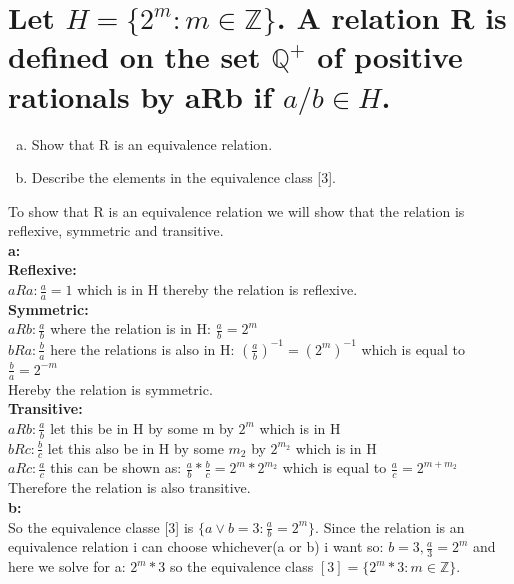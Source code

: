 \newpage
\section{Let $H = \{2^m : m\in \mathbb{Z}\}$. A relation R is defined on the set $\mathbb{Q}^{+}$ of positive rationals by aRb if $a/b\in H$.}
\begin{enumerate}[a.]
\item Show that R is an equivalence relation.
\item Describe the elements in the equivalence class [3].
\end{enumerate}
To show that R is an equivalence relation we will show that the relation is reflexive, symmetric and transitive.\\
\textbf{a:}\\
\textbf{Reflexive:}\\
$aRa: \frac{a}{a}=1$ which is in H thereby the relation is reflexive.\\
\textbf{Symmetric:}\\
$aRb: \frac{a}{b}$ where the relation is in H: $\frac{a}{b}=2^m$\\
$bRa: \frac{b}{a}$ here the relations is also in H: $\left(\frac{a}{b}\right)^{-1}=\left(2^m\right)^{-1}$ which is equal to $\frac{b}{a}=2^{-m}$\\
Hereby the relation is symmetric.\\
\textbf{Transitive:}\\
$aRb:\frac{a}{b}$ let this be in H by some m by $2^m$ which is in H\\
$bRc:\frac{b}{c}$ let this also be in H by some $m_2$ by $2^{m_2}$ which is in H\\
$aRc:\frac{a}{c}$ this can be shown as: $\frac{a}{b}*\frac{b}{c}=2^m*2^{m_2}$ which is equal to $\frac{a}{c}=2^{m+m_2}$\\
Therefore the relation is also transitive.\\
\textbf{b:}\\
So the equivalence classe [3] is $\{a\vee b=3:\frac{a}{b}=2^m\}$. Since the relation is an equivalence relation i can choose whichever(a or b) i want so: $b=3,\frac{a}{3}=2^m$ and here we solve for a: $2^m*3$ so the equivalence class $[3]=\{2^m*3:m\in\mathbb{Z}\}$.
\newpage
